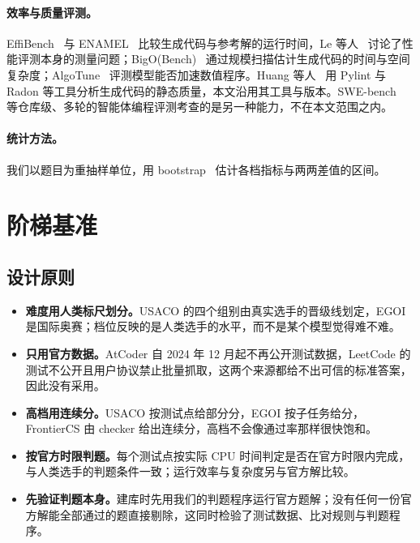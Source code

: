 \documentclass[11pt,a4paper,fontset=none]{ctexart}
\newcommand{\lead}[1]{\textbf{#1}\quad}
\begin{document}
\paragraph{效率与质量评测。}EffiBench~\cite{effibench} 与 ENAMEL~\cite{enamel} 比较生成代码与参考解的运行时间，Le 等人~\cite{perfbench} 讨论了性能评测本身的测量问题；BigO(Bench)~\cite{bigobench} 通过规模扫描估计生成代码的时间与空间复杂度；AlgoTune~\cite{algotune} 评测模型能否加速数值程序。Huang 等人~\cite{staticquality} 用 Pylint 与 Radon 等工具分析生成代码的静态质量，本文沿用其工具与版本。SWE-bench~\cite{swebench} 等仓库级、多轮的智能体编程评测考查的是另一种能力，不在本文范围之内。

\paragraph{统计方法。}我们以题目为重抽样单位，用 bootstrap~\cite{efron1979} 估计各档指标与两两差值的区间。

\section{阶梯基准}
\label{sec:bench}

\subsection{设计原则}

\begin{itemize}[leftmargin=1.6em]
  \item \lead{难度用人类标尺划分。}USACO 的四个组别由真实选手的晋级线划定，EGOI 是国际奥赛；档位反映的是人类选手的水平，而不是某个模型觉得难不难。
  \item \lead{只用官方数据。}AtCoder 自 2024 年 12 月起不再公开测试数据，LeetCode 的测试不公开且用户协议禁止批量抓取，这两个来源都给不出可信的标准答案，因此没有采用。
  \item \lead{高档用连续分。}USACO 按测试点给部分分，EGOI 按子任务给分，FrontierCS 由 checker 给出连续分，高档不会像通过率那样很快饱和。
  \item \lead{按官方时限判题。}每个测试点按实际 CPU 时间判定是否在官方时限内完成，与人类选手的判题条件一致；运行效率与复杂度另与官方解比较。
  \item \lead{先验证判题本身。}建库时先用我们的判题程序运行官方题解；没有任何一份官方解能全部通过的题直接剔除，这同时检验了测试数据、比对规则与判题程序。
\end{itemize}
\end{document}
